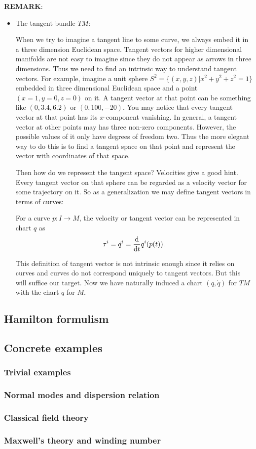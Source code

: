 \textbf{REMARK}:
\begin{itemize}
    \item The tangent bundle $TM$: ~\cite{Classical Dynamics: A Contemporary Approach}
    
    When we try to imagine a tangent line to some curve, we always embed it in a three dimension Euclidean space. Tangent vectors for higher dimensional manifolds are not easy to imagine since they do not appear as arrows in three dimensions. Thus we need to find an intrinsic way to understand tangent vectors. For example, imagine a unit sphere $S^2=\{(x, y, z)\vert x^2+y^2+z^2=1\}$ embedded in three dimensional Euclidean space and a point $(x=1,y=0,z=0)$ on it. A tangent vector at that point can be something like $(0, 3.4, 6.2)$ or $(0, 100, -20)$. You may notice that every tangent vector at that point has its $x$-component vanishing. In general, a tangent vector at other points may has three non-zero components. However, the possible values of it only have degrees of freedom two. Thus the more elegant way to do this is to find a tangent space on that point and represent the vector with coordinates of that space.
    
    Then how do we represent the tangent space? Velocities give a good hint. Every tangent vector on that sphere can be regarded as a velocity vector for some trajectory on it. So as a generalization we may define tangent vectors in terms of curves:
    
    For a curve $p:I\rightarrow M$, the velocity or tangent vector can be represented in chart $q$ as
    \begin{equation}
        \tau^i=\dot{q}^i=\frac{\mathrm{d}}{\mathrm{d} t}q^i(p(t)).
    \end{equation}
    
    This definition of tangent vector is not intrinsic enough since it relies on curves and curves do not correspond uniquely to tangent vectors. But this will suffice our target. Now we have naturally induced a chart $(q,\dot{q})$ for $TM$ with the chart $q$ for $M$.
\end{itemize}

\subsection{Hamilton formulism}

\subsection{Concrete examples}
\subsubsection{Trivial examples}
\subsubsection{Normal modes and dispersion relation}
\subsubsection{Classical field theory}
\subsubsection{Maxwell's theory and winding number}
